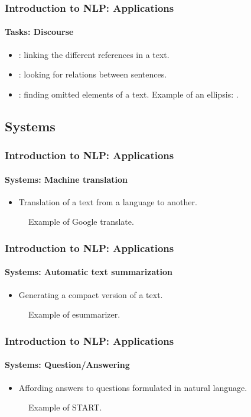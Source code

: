 \documentclass[xcolor=table]{beamer}
\begin{document}
\begin{frame}
\frametitle{Introduction to NLP: Applications}
\framesubtitle{Tasks: Discourse}

\begin{itemize}
	\item {}: linking the different references in a text.
	\item {}: looking for relations between sentences.
	\item {}: finding omitted elements of a text.
	Example of an ellipsis: .
\end{itemize}

\end{frame}

\subsection{Systems}

\begin{frame}
\frametitle{Introduction to NLP: Applications}
\framesubtitle{Systems: Machine translation}

\begin{itemize}
	\item Translation of a text from a language to another.
\end{itemize}

\begin{figure}
	\caption{Example of Google translate.}
\end{figure}

\end{frame}

\begin{frame}
\frametitle{Introduction to NLP: Applications}
\framesubtitle{Systems: Automatic text summarization}

\begin{itemize}
	\item Generating a compact version of a text.
\end{itemize}

\begin{figure}
	\caption{Example of esummarizer.}
\end{figure}

\end{frame}

\begin{frame}
\frametitle{Introduction to NLP: Applications}
\framesubtitle{Systems: Question/Answering}

\begin{itemize}
	\item Affording answers to questions formulated in natural language.
\end{itemize}

\begin{figure}
	\caption{Example of START.}
\end{figure}

\end{frame}
\end{document}
